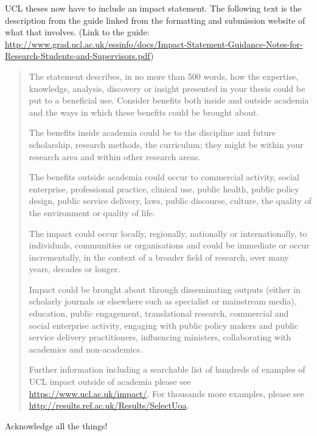 \begin{impactstatement}

	UCL theses now have to include an impact statement. The following text is the description from the guide linked from the formatting and submission website of what that involves. (Link to the guide: {\scriptsize \url{http://www.grad.ucl.ac.uk/essinfo/docs/Impact-Statement-Guidance-Notes-for-Research-Students-and-Supervisors.pdf}})

\begin{quote}
The statement describes, in no more than 500 words, how the expertise, knowledge, analysis,
discovery or insight presented in your thesis could be put to a beneficial use. Consider benefits both
inside and outside academia and the ways in which these benefits could be brought about.

The benefits inside academia could be to the discipline and future scholarship, research methods,
the curriculum; they might be within your research area and within other
research areas.

The benefits outside academia could occur to commercial activity, social enterprise, professional
practice, clinical use, public health, public policy design, public service delivery, laws, public
discourse, culture, the quality of the environment or quality of life.

The impact could occur locally, regionally, nationally or internationally, to individuals, communities or
organisations and could be immediate or occur incrementally, in the context of a broader field of
research, over many years, decades or longer.

Impact could be brought about through disseminating outputs (either in scholarly journals or
elsewhere such as specialist or mainstream media), education, public engagement, translational
research, commercial and social enterprise activity, engaging with public policy makers and public
service delivery practitioners, influencing ministers, collaborating with academics and non-academics.

Further information including a searchable list of hundreds of examples of UCL impact outside of
academia please see \url{https://www.ucl.ac.uk/impact/}. For thousands more examples, please see
\url{http://results.ref.ac.uk/Results/SelectUoa}.
\end{quote}
\end{impactstatement}

\begin{acknowledgements}
Acknowledge all the things!
\end{acknowledgements}

\setcounter{tocdepth}{2}

\tableofcontents
\listoffigures
\listoftables
